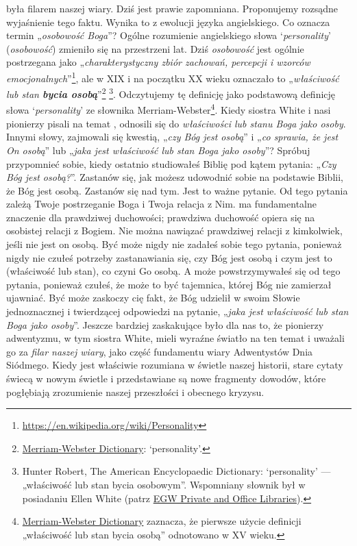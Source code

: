  była filarem naszej wiary. Dziś jest prawie zapomniana. Proponujemy rozsądne wyjaśnienie tego faktu. Wynika to z ewolucji języka angielskiego. Co oznacza termin „\textit{osobowość Boga}”? Ogólne rozumienie angielskiego słowa ‘\textit{personality}’ (\textit{osobowość}) zmieniło się na przestrzeni lat. Dziś \textit{osobowość} jest ogólnie postrzegana jako „\textit{charakterystyczny zbiór zachowań, percepcji i wzorców emocjonalnych}”\footnote{\href{https://en.wikipedia.org/wiki/Personality}{https://en.wikipedia.org/wiki/Personality}}, ale w XIX i na początku XX wieku oznaczało to „\textit{właściwość lub stan \textbf{bycia osobą}}”\footnote{\href{https://www.merriam-webster.com/dictionary/personality}{Merriam-Webster Dictionary}: ‘personality’.} \footnote{Hunter Robert, The American Encyclopaedic Dictionary: ‘personality’ — „właściwość lub stan bycia osobowym”. Wspomniany słownik był w posiadaniu Ellen White (patrz \href{https://repo.adventistdigitallibrary.org/PDFs/adl-22/adl-22251050.pdf?_ga=2.116010630.1065317374.1621993520-1506151612.1617862694&fbclid=IwAR3vwmp8jxtnpPEKv0KD9mCv8dJpmRGoyIXW0CkbQAjbU0h6YaBGqhgBzbk}{EGW Private and Office Libraries}).}. Odczytujemy tę definicję jako podstawową definicję słowa ‘\textit{personality}’ ze słownika Merriam-Webster\footnote{\href{https://www.merriam-webster.com/dictionary/personality\#word-history}{Merriam-Webster Dictionary} zaznacza, że pierwsze użycie definicji „właściwość lub stan bycia osobą” odnotowano w XV wieku.}. Kiedy siostra White i nasi pionierzy pisali na temat , odnosili się do \textit{właściwości lub stanu Boga jako osoby}. Innymi słowy, zajmowali się kwestią, „\textit{czy Bóg jest osobą}” i „\textit{co sprawia, że jest On osobą}” lub „\textit{jaka jest właściwość lub stan Boga jako osoby}”? Spróbuj przypomnieć sobie, kiedy ostatnio studiowałeś Biblię pod kątem pytania: „\textit{Czy Bóg jest osobą?}”. Zastanów się, jak możesz udowodnić sobie na podstawie Biblii, że Bóg jest osobą. Zastanów się nad tym. Jest to ważne pytanie. Od tego pytania zależą Twoje postrzeganie Boga i Twoja relacja z Nim.  ma fundamentalne znaczenie dla prawdziwej duchowości; prawdziwa duchowość opiera się na osobistej relacji z Bogiem. Nie można nawiązać prawdziwej relacji z kimkolwiek, jeśli nie jest on osobą. Być może nigdy nie zadałeś sobie tego pytania, ponieważ nigdy nie czułeś potrzeby zastanawiania się, czy Bóg jest osobą i czym jest to (właściwość lub stan), co czyni Go osobą. A może powstrzymywałeś się od tego pytania, ponieważ czułeś, że może to być tajemnica, której Bóg nie zamierzał ujawniać. Być może zaskoczy cię fakt, że Bóg udzielił w swoim Słowie jednoznacznej i twierdzącej odpowiedzi na pytanie, „\textit{jaka jest właściwość lub stan Boga jako osoby}”. Jeszcze bardziej zaskakujące było dla nas to, że pionierzy adwentyzmu, w tym siostra White, mieli wyraźne światło na ten temat i uważali go za \textit{filar naszej wiary}, jako część fundamentu wiary Adwentystów Dnia Siódmego. Kiedy  jest właściwie rozumiana w świetle naszej historii, stare cytaty świecą w nowym świetle i przedstawiane są nowe fragmenty dowodów, które pogłębiają zrozumienie naszej przeszłości i obecnego kryzysu.


